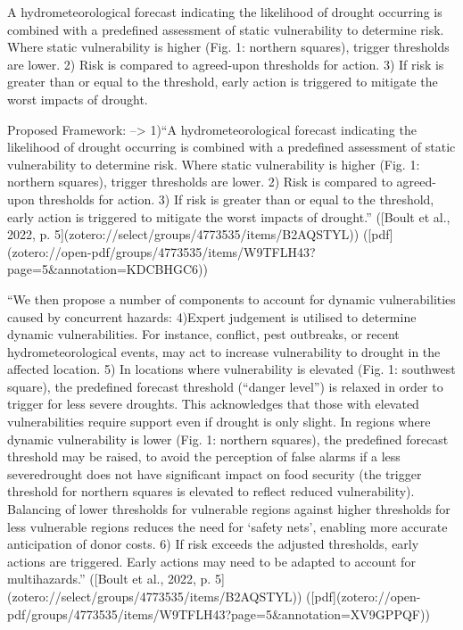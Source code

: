 A hydrometeorological forecast indicating the likelihood of drought occurring is combined with a predefined assessment of static vulnerability to determine risk. Where static vulnerability is higher (Fig. 1: northern squares), trigger thresholds are lower. 2) Risk is compared to agreed-upon thresholds for action. 3) If risk is greater than or equal to the threshold, early action is triggered to mitigate the worst impacts of drought.

Proposed Framework:
--> 1)“A hydrometeorological forecast indicating the likelihood of drought occurring is combined with a predefined assessment of static vulnerability to determine risk. Where static vulnerability is higher (Fig. 1: northern squares), trigger thresholds are lower.
2) Risk is compared to agreed-upon thresholds for action.
3) If risk is greater than or equal to the threshold, early action is triggered to mitigate the worst impacts of drought.” ([Boult et al., 2022, p. 5](zotero://select/groups/4773535/items/B2AQSTYL)) ([pdf](zotero://open-pdf/groups/4773535/items/W9TFLH43?page=5&annotation=KDCBHGC6))

“We then propose a number of components to account for dynamic vulnerabilities caused by concurrent hazards:
4)Expert judgement is utilised to determine dynamic vulnerabilities. For instance, conflict, pest outbreaks, or recent hydrometeorological events, may act to increase vulnerability to drought in the affected location.
5) In locations where vulnerability is elevated (Fig. 1: southwest square), the predefined forecast threshold (“danger level”) is relaxed in order to trigger for less severe droughts. This acknowledges that those with elevated vulnerabilities require support even if drought is only slight. In regions where dynamic vulnerability is lower (Fig. 1: northern squares), the predefined forecast threshold may be raised, to avoid the perception of false alarms if a less severedrought does not have significant impact on food security (the trigger threshold for northern squares is elevated to reflect reduced vulnerability). Balancing of lower thresholds for vulnerable regions against higher thresholds for less vulnerable regions reduces the need for ‘safety nets’, enabling more accurate anticipation of donor costs.
6) If risk exceeds the adjusted thresholds, early actions are triggered. Early actions may need to be adapted to account for multihazards.” ([Boult et al., 2022, p. 5](zotero://select/groups/4773535/items/B2AQSTYL)) ([pdf](zotero://open-pdf/groups/4773535/items/W9TFLH43?page=5&annotation=XV9GPPQF))

